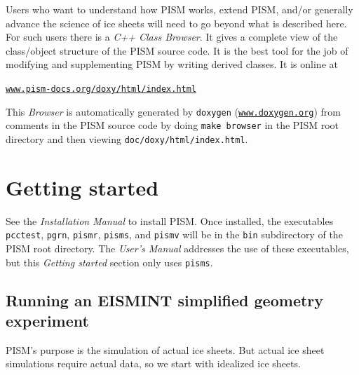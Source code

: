 \documentclass[11pt,final]{amsart}
\renewcommand{\t}[1]{\texttt{#1}}
\begin{document}
Users who want to understand how PISM works, extend PISM, and/or generally advance the science of ice sheets will need to go beyond what is described here.  For such users there is a \emph{C++ Class Browser}.  It gives a complete view of the class/object structure of the PISM source code.  It is the best tool for the job of modifying and supplementing PISM by writing derived classes.  It is online at
   \begin{center}
     \href{http://www.pism-docs.org/doxy/html/index.html}{\t{www.pism-docs.org/doxy/html/index.html}}
   \end{center}
This \emph{Browser} is automatically generated by \verb|doxygen| (\href{http://www.doxygen.org/}{\t{www.doxygen.org}}) from comments in the PISM source code by doing \verb|make browser| in the PISM root directory and then viewing \verb|doc/doxy/html/index.html|.  

\vspace{1.0in}
\large
\begin{center}
\normalsize
\end{center}
\normalsize


\clearpage\newpage
\section{Getting started}\label{sect:start}

See the \emph{Installation Manual} to install PISM.  Once installed, the executables \verb|pcctest|, \verb|pgrn|, \verb|pismr|, \verb|pisms|, and \verb|pismv| will be in the \verb|bin| subdirectory of the PISM root directory.  The \emph{User's Manual} addresses the use of these executables, but this \emph{Getting started} section only uses \verb|pisms|.
 
\subsection{Running an EISMINT simplified geometry experiment}  PISM's purpose is the simulation of actual ice sheets.  But actual ice sheet simulations require actual data, so we start with idealized ice sheets.
\end{document}

